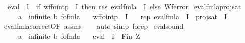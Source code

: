 \begin{isabellebody}
\ \ {\isachardoublequoteopen}eval\ {\isasymphi}\ I\ {\isacharequal}{\kern0pt}\ {\isacharparenleft}{\kern0pt}if\ wf{\isacharunderscore}{\kern0pt}fo{\isacharunderscore}{\kern0pt}intp\ {\isasymphi}\ I\ then\ res\ {\isacharparenleft}{\kern0pt}eval{\isacharunderscore}{\kern0pt}fmla\ {\isasymphi}\ I{\isacharparenright}{\kern0pt}\ else\ Wf{\isacharunderscore}{\kern0pt}error{\isacharparenright}{\kern0pt}{\isachardoublequoteclose}\isanewline
\isanewline
{}\isamarkupfalse%
\ eval{\isacharunderscore}{\kern0pt}fmla{\isacharunderscore}{\kern0pt}proj{\isacharunderscore}{\kern0pt}sat{\isacharcolon}{\kern0pt}\isanewline
\ \ \ {\isasymphi}\ {\isacharcolon}{\kern0pt}{\isacharcolon}{\kern0pt}\ {\isachardoublequoteopen}{\isacharparenleft}{\kern0pt}{\isacharprime}{\kern0pt}a\ {\isacharcolon}{\kern0pt}{\isacharcolon}{\kern0pt}\ infinite{\isacharcomma}{\kern0pt}\ {\isacharprime}{\kern0pt}b{\isacharparenright}{\kern0pt}\ fo{\isacharunderscore}{\kern0pt}fmla{\isachardoublequoteclose}\isanewline
\ \ \ {\isachardoublequoteopen}wf{\isacharunderscore}{\kern0pt}fo{\isacharunderscore}{\kern0pt}intp\ {\isasymphi}\ I{\isachardoublequoteclose}\isanewline
\ \ \ {\isachardoublequoteopen}rep\ {\isacharparenleft}{\kern0pt}eval{\isacharunderscore}{\kern0pt}fmla\ {\isasymphi}\ I{\isacharparenright}{\kern0pt}\ {\isacharequal}{\kern0pt}\ proj{\isacharunderscore}{\kern0pt}sat\ {\isasymphi}\ I{\isachardoublequoteclose}\isanewline
%
\isadelimproof
\ \ %
\endisadelimproof
%
\isatagproof
{}\isamarkupfalse%
\ eval{\isacharunderscore}{\kern0pt}fmla{\isacharunderscore}{\kern0pt}correct{\isacharbrackleft}{\kern0pt}OF\ assms{\isacharbrackright}{\kern0pt}\isanewline
\ \ \isamarkupfalse%
\ {\isacharparenleft}{\kern0pt}auto\ simp{\isacharcolon}{\kern0pt}\ fo{\isacharunderscore}{\kern0pt}rep{\isacharparenright}{\kern0pt}%
\endisatagproof
{\isafoldproof}%
%
\isadelimproof
\isanewline
%
\endisadelimproof
\isanewline
{}\isamarkupfalse%
\ eval{\isacharunderscore}{\kern0pt}sound{\isacharcolon}{\kern0pt}\isanewline
\ \ \ {\isasymphi}\ {\isacharcolon}{\kern0pt}{\isacharcolon}{\kern0pt}\ {\isachardoublequoteopen}{\isacharparenleft}{\kern0pt}{\isacharprime}{\kern0pt}a\ {\isacharcolon}{\kern0pt}{\isacharcolon}{\kern0pt}\ infinite{\isacharcomma}{\kern0pt}\ {\isacharprime}{\kern0pt}b{\isacharparenright}{\kern0pt}\ fo{\isacharunderscore}{\kern0pt}fmla{\isachardoublequoteclose}\isanewline
\ \ \ {\isachardoublequoteopen}eval\ {\isasymphi}\ I\ {\isacharequal}{\kern0pt}\ Fin\ Z{\isachardoublequoteclose}\isanewline

\end{isabellebody}
